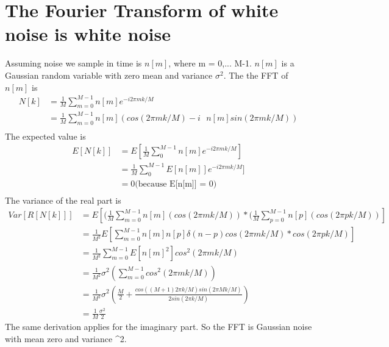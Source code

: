 \documentclass[a4paper]{article}
\begin{document}
\section{The Fourier Transform of  white noise is white noise}
Assuming noise we sample in time is $n[m]$, where m = 0,... M-1. $n[m]$ is a Gaussian random variable with zero mean and variance $\sigma^2$. The the FFT of $n[m]$ is
\begin{align*}
	N[k] &= \frac{1}{M}\sum_{m=0}^{M-1} n[m] e^{-i2\pi m k/M}\\
	     &= \frac{1}{M}\sum_{m=0}^{M-1} n[m] (cos(2\pi m k/M) - i \textrm{ }n[m] sin(2\pi m k/M))\\	
\end{align*}
The expected value is
\begin{align*}
	E[N[k]] & = E[\frac{1}{M} \sum_0^{M-1} n[m] e^{-i2\pi m k/M}]\\
			& = \frac{1}{M}\sum_0^{M-1} E[n[m]] e^{-i2\pi m k/M}] \\
			& = 0 \textrm{(because E[n[m]] = 0)} \\
\end{align*}
The variance of the real part is
\begin{align*}
	Var[R[N[k]]] & = E[(\frac{1}{M}\sum_{m=0}^{M-1} n[m] (cos(2\pi m k/M))
	*(\frac{1}{M}\sum_{p=0}^{M-1} n[p] (cos(2\pi p k/M))]\\
	             & = \frac{1}{M^2}
	             E[\sum_{m=0}^{M-1} n[m] n[p] \delta(n-p) cos(2\pi m k/M)* cos(2\pi p k/M)]\\
	             & = \frac{1}{M^2} \sum_{m=0}^{M-1} E[n[m]^2]  cos^2(2\pi m k/M) \\
	             & = \frac{1}{M^2} \sigma^2(\sum_{m=0}^{M-1}  cos^2(2\pi m k/M)) \\
	             & = \frac{1}{M^2} \sigma^2(\frac{M}{2} + \frac{cos((M+1)2 \pi k/M) sin(2 \pi M k /M)}{2sin(2 \pi k /M)})\\
				 & = \frac{1}{M} \frac{\sigma^2}{2} 	             
\end{align*}
The same derivation applies for the imaginary part. So the FFT is Gaussian noise with mean zero and variance \sigma^2.
\end{document}
